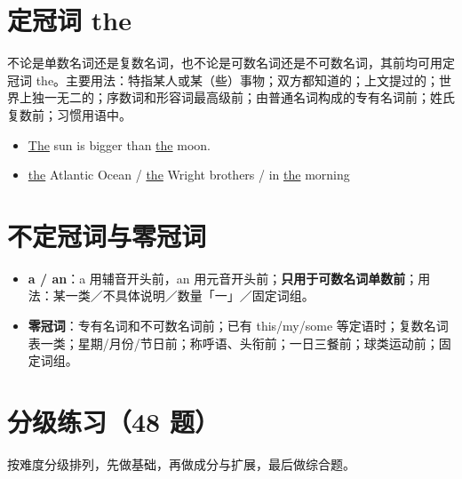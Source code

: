 \documentclass[11pt,a4paper]{ctexart}
\begin{document}
\section{定冠词 the}
不论是单数名词还是复数名词，也不论是可数名词还是不可数名词，其前均可用定冠词 the。主要用法：特指某人或某（些）事物；双方都知道的；上文提过的；世界上独一无二的；序数词和形容词最高级前；由普通名词构成的专有名词前；姓氏复数前；习惯用语中。
\begin{itemize}[leftmargin=1.4em]
\item \underline{The} sun is bigger than \underline{the} moon.
\item \underline{the} Atlantic Ocean / \underline{the} Wright brothers / in \underline{the} morning
\end{itemize}

\section{不定冠词与零冠词}
\begin{itemize}[leftmargin=1.4em]
\item \textbf{a / an}：a 用辅音开头前，an 用元音开头前；\textbf{只用于可数名词单数前}；用法：某一类／不具体说明／数量「一」／固定词组。
\item \textbf{零冠词}：专有名词和不可数名词前；已有 this/my/some 等定语时；复数名词表一类；星期/月份/节日前；称呼语、头衔前；一日三餐前；球类运动前；固定词组。
\end{itemize}


\newpage
\section{分级练习（48 题）}
\noindent 按难度分级排列，先做基础，再做成分与扩展，最后做综合题。
\end{document}
